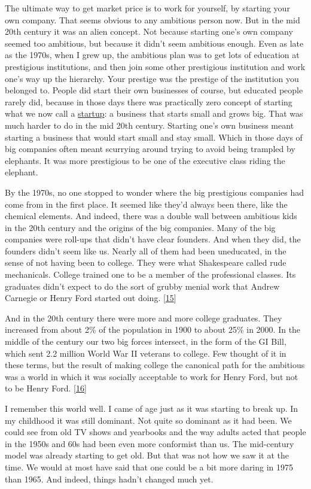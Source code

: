 The ultimate way to get market price is to work for yourself, by
starting your own company. That seems obvious to any ambitious person
now. But in the mid 20th century it was an alien concept. Not because
starting one's own company seemed too ambitious, but because it didn't
seem ambitious enough. Even as late as the 1970s, when I grew up, the
ambitious plan was to get lots of education at prestigious institutions,
and then join some other prestigious institution and work one's way up
the hierarchy. Your prestige was the prestige of the institution you
belonged to. People did start their own businesses of course, but
educated people rarely did, because in those days there was practically
zero concept of starting what we now call a \href{growth.html}{startup}:
a business that starts small and grows big. That was much harder to do
in the mid 20th century. Starting one's own business meant starting a
business that would start small and stay small. Which in those days of
big companies often meant scurrying around trying to avoid being
trampled by elephants. It was more prestigious to be one of the
executive class riding the elephant.

By the 1970s, no one stopped to wonder where the big prestigious
companies had come from in the first place. It seemed like they'd always
been there, like the chemical elements. And indeed, there was a double
wall between ambitious kids in the 20th century and the origins of the
big companies. Many of the big companies were roll-ups that didn't have
clear founders. And when they did, the founders didn't seem like us.
Nearly all of them had been uneducated, in the sense of not having been
to college. They were what Shakespeare called rude mechanicals. College
trained one to be a member of the professional classes. Its graduates
didn't expect to do the sort of grubby menial work that Andrew Carnegie
or Henry Ford started out doing. {[}\hyperref[f15n]{15}{]}

And in the 20th century there were more and more college graduates. They
increased from about 2\% of the population in 1900 to about 25\% in
2000. In the middle of the century our two big forces intersect, in the
form of the GI Bill, which sent 2.2 million World War II veterans to
college. Few thought of it in these terms, but the result of making
college the canonical path for the ambitious was a world in which it was
socially acceptable to work for Henry Ford, but not to be Henry Ford.
{[}\hyperref[f16n]{16}{]}

I remember this world well. I came of age just as it was starting to
break up. In my childhood it was still dominant. Not quite so dominant
as it had been. We could see from old TV shows and yearbooks and the way
adults acted that people in the 1950s and 60s had been even more
conformist than us. The mid-century model was already starting to get
old. But that was not how we saw it at the time. We would at most have
said that one could be a bit more daring in 1975 than 1965. And indeed,
things hadn't changed much yet.

